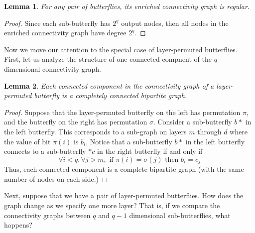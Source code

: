 \documentclass[12pt]{article}
\newtheorem{lemma}{Lemma}
\begin{document}
\begin{lemma} \label{enriched graph is regular}
For any pair of butterflies, its enriched connectivity graph is regular.
\end{lemma}

\begin{proof} Since each sub-butterfly has $2^{q}$ output nodes, then all 
nodes in the enriched connectivity graph have degree $2^{q}$.
\end{proof}

Now we move our attention to the special case of layer-permuted butterflies.
First, let us analyze the structure of one connected compnent of
the $q$-dimensional connectivity graph.

\begin{lemma} \label{connected components}
Each connected component in the connectivity graph of a layer-permuted
butterfly is a completely connected bipartite graph.
\end{lemma}

\begin{proof}
Suppose that the layer-permuted butterfly on the left has permutation
$\pi$, and the butterfly on the right has permutation $\sigma$.
Consider a sub-butterfly $b*$ in the left butterfly.  This corresponds to 
a sub-graph on layers $m$ through $d$ where the value of bit $\pi(i)$ 
is $b_{i}$.  Notice that a sub-butterfly $b*$ in the left butterfly 
connects to 
a  sub-butterfly $*c$ in the right butterfly if and only if
\begin{equation} \label{sub-butterfly connection}
\forall i < q, \forall j > m, \mbox{ if }\pi(i)=\sigma(j) 
\mbox{ then } b_{i} = c_{j} 
\end{equation}
Thus, each connected 
component is a complete bipartite graph (with the same
number of nodes on each side.)
\end{proof}

Next, suppose that we have a pair of layer-permuted butterflies.  
How does the graph change as we specify one more
layer?  That is, if we compare the connectivity graphs between $q$ 
and $q-1$ dimensional sub-butterflies, what happens?  
\end{document}
